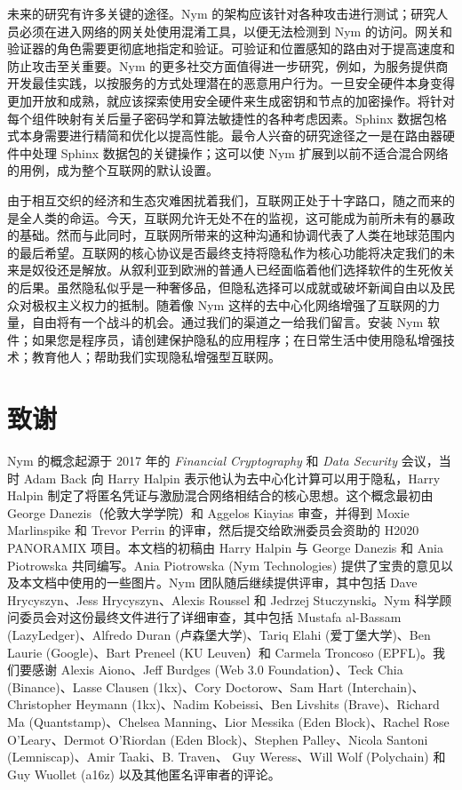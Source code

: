 \documentclass{article}
\begin{document}
	未来的研究有许多关键的途径。Nym 的架构应该针对各种攻击进行测试；研究人员必须在进入网络的网关处使用混淆工具，以便无法检测到 Nym 的访问。网关和验证器的角色需要更彻底地指定和验证。可验证和位置感知的路由对于提高速度和防止攻击至关重要。Nym 的更多社交方面值得进一步研究，例如，为服务提供商开发最佳实践，以按服务的方式处理潜在的恶意用户行为。一旦安全硬件本身变得更加开放和成熟，就应该探索使用安全硬件来生成密钥和节点的加密操作。将针对每个组件映射有关后量子密码学和算法敏捷性的各种考虑因素。Sphinx 数据包格式本身需要进行精简和优化以提高性能。最令人兴奋的研究途径之一是在路由器硬件中处理 Sphinx 数据包的关键操作；这可以使 Nym 扩展到以前不适合混合网络的用例，成为整个互联网的默认设置\cite{ref20}。\newline

	由于相互交织的经济和生态灾难困扰着我们，互联网正处于十字路口，随之而来的是全人类的命运。今天，互联网允许无处不在的监视，这可能成为前所未有的暴政的基础。然而与此同时，互联网所带来的这种沟通和协调代表了人类在地球范围内的最后希望。互联网的核心协议是否最终支持将隐私作为核心功能将决定我们的未来是奴役还是解放。从叙利亚到欧洲的普通人已经面临着他们选择软件的生死攸关的后果。虽然隐私似乎是一种奢侈品，但隐私选择可以成就或破坏新闻自由以及民众对极权主义权力的抵制。随着像 Nym 这样的去中心化网络增强了互联网的力量，自由将有一个战斗的机会。通过我们的渠道之一给我们留言。安装 Nym 软件；如果您是程序员，请创建保护隐私的应用程序；在日常生活中使用隐私增强技术；教育他人；帮助我们实现隐私增强型互联网。\newline
	
	\section*{致谢}

	Nym 的概念起源于 2017 年的 \emph{Financial Cryptography} 和 \emph{Data Security} 会议，当时 Adam Back 向 Harry Halpin 表示他认为去中心化计算可以用于隐私，Harry Halpin 制定了将匿名凭证与激励混合网络相结合的核心思想。这个概念最初由 George Danezis（伦敦大学学院）和 Aggelos Kiayias 审查，并得到 Moxie Marlinspike 和 Trevor Perrin 的评审，然后提交给欧洲委员会资助的 H2020 PANORAMIX 项目。本文档的初稿由 Harry Halpin 与 George Danezis 和 Ania Piotrowska 共同编写。Ania Piotrowska (Nym Technologies) 提供了宝贵的意见以及本文档中使用的一些图片。Nym 团队随后继续提供评审，其中包括 Dave Hrycyszyn、Jess Hrycyszyn、Alexis Roussel 和 Jedrzej Stuczynski。Nym 科学顾问委员会对这份最终文件进行了详细审查，其中包括 Mustafa al-Bassam (LazyLedger)、Alfredo Duran (卢森堡大学)、Tariq Elahi (爱丁堡大学)、Ben Laurie (Google)、Bart Preneel (KU Leuven）和 Carmela Troncoso (EPFL)。我们要感谢 Alexis Aiono、Jeff Burdges (Web 3.0 Foundation）、Teck Chia (Binance)、Lasse Clausen (1kx)、Cory Doctorow、Sam Hart (Interchain)、Christopher Heymann (1kx)、Nadim Kobeissi、Ben Livshits (Brave)、Richard Ma (Quantstamp)、Chelsea Manning、Lior Messika (Eden Block)、Rachel Rose O'Leary、Dermot O'Riordan (Eden Block)、Stephen Palley、Nicola Santoni (Lemniscap)、Amir Taaki、B. Traven、 Guy Weress、Will Wolf (Polychain) 和 Guy Wuollet (a16z) 以及其他匿名评审者的评论。
	
\end{document}
